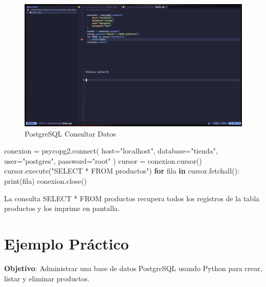 \documentclass[
  a4paper,
  DIV=11,
  numbers=noendperiod,
  onepage,
  openany]{scrreprt}
\newenvironment{Shaded}{\begin{snugshade}}{\end{snugshade}}
\newcommand{\BuiltInTok}[1]{\textcolor[rgb]{0.00,0.23,0.31}{#1}}
\newcommand{\ControlFlowTok}[1]{\textcolor[rgb]{0.00,0.23,0.31}{\textbf{#1}}}
\newcommand{\ExtensionTok}[1]{\textcolor[rgb]{0.00,0.23,0.31}{#1}}
\newcommand{\KeywordTok}[1]{\textcolor[rgb]{0.00,0.23,0.31}{\textbf{#1}}}
\newcommand{\NormalTok}[1]{\textcolor[rgb]{0.00,0.23,0.31}{#1}}
\newcommand{\OperatorTok}[1]{\textcolor[rgb]{0.37,0.37,0.37}{#1}}
\newcommand{\StringTok}[1]{\textcolor[rgb]{0.13,0.47,0.30}{#1}}
\begin{document}
\begin{figure}[H]

{\centering \includegraphics[width=8.33333in,height=\textheight,keepaspectratio]{unidades/unidad6/./images/postgresql_code004.png}

}

\caption{PostgreSQL Consultar Datos}

\end{figure}%

\begin{Shaded}
\begin{Highlighting}[]
\NormalTok{conexion }\OperatorTok{=}\NormalTok{ psycopg2.}\ExtensionTok{connect}\NormalTok{(}
\NormalTok{    host}\OperatorTok{=}\StringTok{"localhost"}\NormalTok{,}
\NormalTok{    database}\OperatorTok{=}\StringTok{"tienda"}\NormalTok{,}
\NormalTok{    user}\OperatorTok{=}\StringTok{"postgres"}\NormalTok{,}
\NormalTok{    password}\OperatorTok{=}\StringTok{"root"}
\NormalTok{)}
\NormalTok{cursor }\OperatorTok{=}\NormalTok{ conexion.cursor()}
\NormalTok{cursor.execute(}\StringTok{"SELECT * FROM productos"}\NormalTok{)}
\ControlFlowTok{for}\NormalTok{ fila }\KeywordTok{in}\NormalTok{ cursor.fetchall():}
    \BuiltInTok{print}\NormalTok{(fila)}
\NormalTok{conexion.close()}
\end{Highlighting}
\end{Shaded}

La consulta SELECT * FROM productos recupera todos los registros de la
tabla productos y los imprime en pantalla.

\section{Ejemplo Práctico}\label{ejemplo-pruxe1ctico-14}

\textbf{Objetivo}: Administrar una base de datos PostgreSQL usando
Python para crear, listar y eliminar productos.
\end{document}
